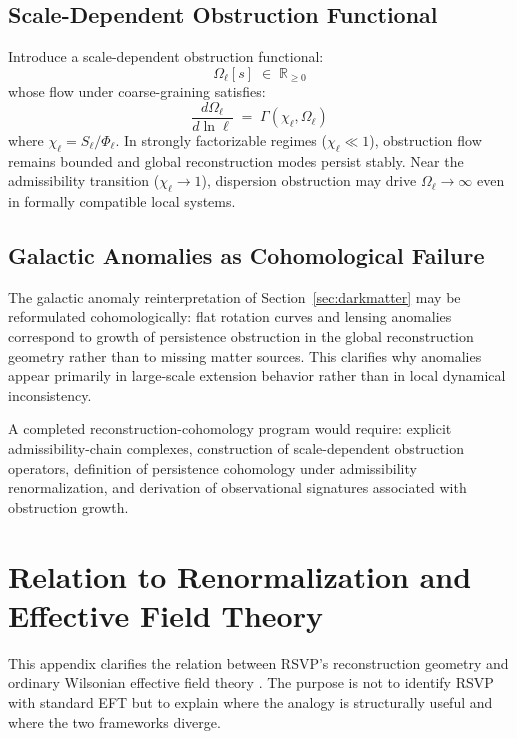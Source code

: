 \documentclass[11pt, a4paper]{article}
\theoremstyle{plain}
\theoremstyle{definition}
\theoremstyle{remark}
\begin{document}
\subsection{Scale-Dependent Obstruction Functional}

Introduce a scale-dependent obstruction functional:
\[
  \Omega_\ell[s] \;\in\; \mathbb{R}_{\geq 0}
\]
whose flow under coarse-graining satisfies:
\begin{equation}
  \frac{d\Omega_\ell}{d\ln\ell} \;=\; \Gamma\!\left(\chi_\ell, \Omega_\ell\right)
\end{equation}
where $\chi_\ell = S_\ell/\Phi_\ell$. In strongly factorizable regimes ($\chi_\ell
\ll 1$), obstruction flow remains bounded and global reconstruction modes persist
stably. Near the admissibility transition ($\chi_\ell \to 1$), dispersion obstruction
may drive $\Omega_\ell \to \infty$ even in formally compatible local systems.

\subsection{Galactic Anomalies as Cohomological Failure}

The galactic anomaly reinterpretation of Section~\ref{sec:darkmatter} may be
reformulated cohomologically: flat rotation curves and lensing anomalies correspond
to growth of persistence obstruction in the global reconstruction geometry rather
than to missing matter sources. This clarifies why anomalies appear primarily in
large-scale extension behavior rather than in local dynamical inconsistency.

A completed reconstruction-cohomology program would require: explicit
admissibility-chain complexes, construction of scale-dependent obstruction operators,
definition of persistence cohomology under admissibility renormalization, and
derivation of observational signatures associated with obstruction growth.

\section{Relation to Renormalization and Effective Field Theory}
\label{app:rg}

This appendix clarifies the relation between RSVP's reconstruction geometry and
ordinary Wilsonian effective field theory \cite{wilson1974,goldenfeld1992}. The
purpose is not to identify RSVP with standard EFT but to explain where the analogy
is structurally useful and where the two frameworks diverge.
\end{document}
